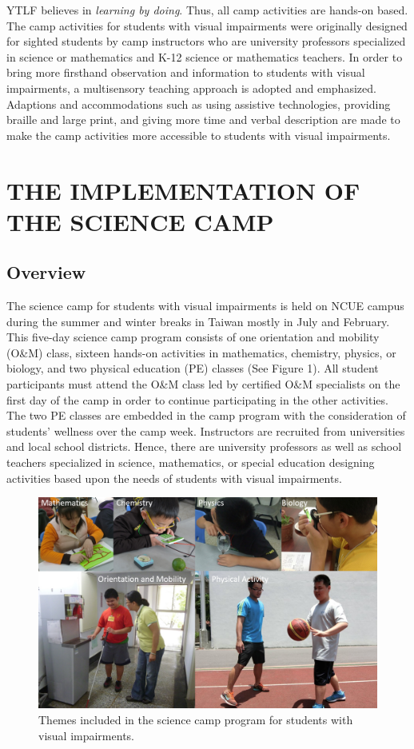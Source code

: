 \documentclass[11.5pt]{sig-alternate} %
\begin{document}
\begin{large}
YTLF believes in \textit{learning by doing}. Thus, all camp activities are hands-on based. The camp activities for students with visual impairments were originally designed for sighted students by camp instructors who are university professors specialized in science or mathematics and K-12 science or mathematics teachers. In order to bring more firsthand observation and information to students with visual impairments, a multisensory teaching approach is adopted and emphasized. Adaptions and accommodations such as using assistive technologies, providing braille and large print, and giving more time and verbal description are made to make the camp activities more accessible to students with visual impairments.

\section*{THE IMPLEMENTATION OF THE SCIENCE CAMP}

\subsection*{Overview}

The science camp for students with visual impairments is held on NCUE campus during the summer and winter breaks in Taiwan mostly in July and February. This five-day science camp program consists of one orientation and mobility (O\&M) class, sixteen hands-on activities in mathematics, chemistry, physics, or biology, and two physical education (PE) classes (See Figure 1). All student participants must attend the O\&M class led by certified O\&M specialists on the first day of the camp in order to continue participating in the other activities. The two PE classes are embedded in the camp program with the consideration of students’ wellness over the camp week. Instructors are recruited from universities and local school districts. Hence, there are university professors as well as school teachers specialized in science, mathematics, or special education designing activities based upon the needs of students with visual impairments.

\begin{figure}[h]
    \centering
    \includegraphics[width=1\linewidth]{Fig1.png}
    \caption{Themes included in the science camp program for students with visual impairments.}
\end{figure}


\end{large}
\end{document}
